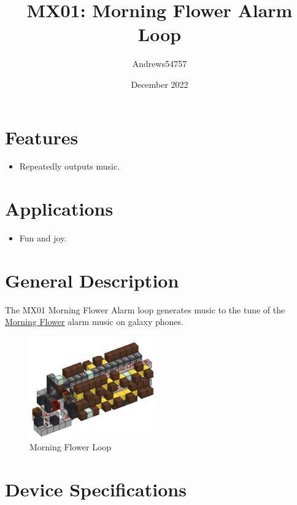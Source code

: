 \documentclass[10pt]{datasheet}
\title{MX01: Morning Flower Alarm Loop}
\author{Andrews54757}
\date{December 2022}
\begin{document}
\maketitle

\section{Features}

\begin{itemize}
\item{Repeatedly outputs music.}
\end{itemize}

\section{Applications}

\begin{itemize}
\item{Fun and joy.}
\end{itemize}

\section{General Description}
The MX01 Morning Flower Alarm loop generates music to the tune of the \href{https://www.youtube.com/watch?v=vTVWGoQcn9Q}{Morning Flower} alarm music on galaxy phones.
\vfill\break

\begin{figure}[h]
    \centering
    \includegraphics[width=0.48\textwidth]{morning_loop.png}
    \caption{\centering Morning Flower Loop}
\end{figure}

\onecolumn

\section{Device Specifications}
\end{document}
